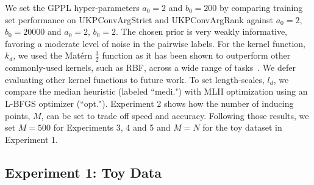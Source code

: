 We set the GPPL hyper-parameters $a_0=2$ and $b_0=200$ by comparing
training set performance on UKPConvArgStrict and UKPConvArgRank against $a_0=2$, $b_0=20000$ and $a_0=2$, $b_0=2$.
The chosen prior is very weakly informative, favoring a moderate level of noise in the pairwise labels.
For the kernel function, $k_d$, we used the 
Mat\'ern $\frac{3}{2}$ function as it has been shown to outperform 
other commonly-used kernels, such as RBF, across a wide range of tasks~\cite{rasmussen_gaussian_2006}.
We defer evaluating other kernel functions to future work.
To set length-scales, $l_d$, we compare the median heuristic (labeled ``medi.")
with MLII optimization using an L-BFGS optimizer (``opt."). Experiment 2 shows how
the number of inducing points, $M$, can be set to trade off speed and accuracy. 
Following those results, we set $M=500$ for Experiments 3, 4 and 5 and $M=N$ for the toy dataset in Experiment 1.

\subsection{Experiment 1: Toy Data}

